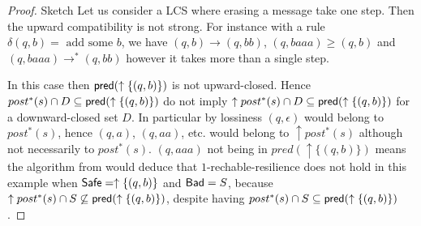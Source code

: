 \begin{proof}{Sketch}
Let us consider a LCS where erasing a message take one step. Then the upward compatibility is not strong. 
For instance with a rule $\delta(q,b) = \text{ add some }b $,
we have $(q,b) \to (q,bb)$, $(q, baaa) \geq (q,b)$ and
$(q, baaa) \to^* (q,bb)$ however it takes more than a single step.

In this case then $\textsf{pred}(\uparrow \{(q,b)\})$ is not upward-closed. Hence 
$post^* (s) \cap D \subseteq \textsf{pred}(\uparrow \{(q,b)\})$
do not imply
$\uparrow post^* (s) \cap D \subseteq \textsf{pred}(\uparrow \{(q,b)\})$ for a downward-closed set $D$.
In particular by lossiness $(q, \epsilon)$ would belong to
$post^* (s)$,
hence $(q,a)$, $(q,aa)$, etc. would belong to $\uparrow post^* (s)$ although not necessarily to
$post^* (s)$. $(q,aaa)$ not being in $pred(\uparrow \{ (q,b)\})$ means the algorithm 
from \cite{DBLP:conf/gg/Ozkan22} would deduce that $1$-rechable-resilience does not hold in this example when $\textsf{Safe}=\uparrow \{(q,b)\}$ and $\textsf{Bad} =S$,
because $\uparrow post^* (s) \cap S \not\subseteq \textsf{pred}(\uparrow \{(q,b)\})$,
despite having 
$post^* (s) \cap S \subseteq \textsf{pred}(\uparrow \{(q,b)\})$.

\iffalse
{}
\end{proof}
